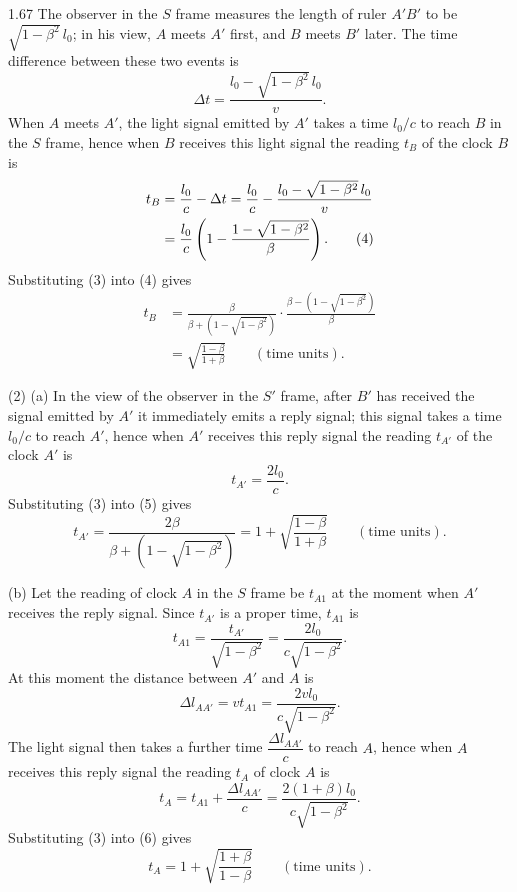 \begin{solution}{1.67}
The observer in the $S$ frame measures the length of ruler $A'B'$ to be $\sqrt{1-\beta^2}\,l_0$; in his view, $A$ meets $A'$ first, and $B$ meets $B'$ later. The time difference between these two events is
\[
\Delta t=\frac{l_0-\sqrt{1-\beta^2}\,l_0}{v}.
\]
When $A$ meets $A'$, the light signal emitted by $A'$ takes a time $l_0/c$ to reach $B$ in the $S$ frame, hence when $B$ receives this light signal the reading $t_B$ of the clock $B$ is
\begin{align}
t_B&=\frac{l_0}{c}-\Delta t=\frac{l_0}{c}-\frac{l_0-\sqrt{1-\beta^2}\,l_0}{v}\notag\\
&=\frac{l_0}{c}\left(1-\frac{1-\sqrt{1-\beta^2}}{\beta}\right). \tag{4}
\end{align}
Substituting (3) into (4) gives
\begin{align*}
t_B&=\frac{\beta}{\beta+\left(1-\sqrt{1-\beta^2}\right)}\cdot\frac{\beta-\left(1-\sqrt{1-\beta^2}\right)}{\beta}\\
&=\sqrt{\frac{1-\beta}{1+\beta}}\qquad(\text{time units}).
\end{align*}

(2) (a) In the view of the observer in the $S'$ frame, after $B'$ has received the signal emitted by $A'$ it immediately emits a reply signal; this signal takes a time $l_0/c$ to reach $A'$, hence when $A'$ receives this reply signal the reading $t_{A'}$ of the clock $A'$ is
\begin{equation}
t_{A'}=\frac{2l_0}{c}. \tag{5}
\end{equation}
Substituting (3) into (5) gives
\[
t_{A'}=\frac{2\beta}{\beta+\left(1-\sqrt{1-\beta^2}\right)}
=1+\sqrt{\frac{1-\beta}{1+\beta}}\qquad(\text{time units}).
\]

(b) Let the reading of clock $A$ in the $S$ frame be $t_{A1}$ at the moment when $A'$ receives the reply signal. Since $t_{A'}$ is a proper time, $t_{A1}$ is
\[
t_{A1}=\frac{t_{A'}}{\sqrt{1-\beta^2}}=\frac{2l_0}{c\sqrt{1-\beta^2}}.
\]
At this moment the distance between $A'$ and $A$ is
\[
\Delta l_{AA'}=vt_{A1}=\frac{2vl_0}{c\sqrt{1-\beta^2}}.
\]
The light signal then takes a further time $\dfrac{\Delta l_{AA'}}{c}$ to reach $A$, hence when $A$ receives this reply signal the reading $t_A$ of clock $A$ is
\begin{equation}
t_A=t_{A1}+\frac{\Delta l_{AA'}}{c}=\frac{2(1+\beta)l_0}{c\sqrt{1-\beta^2}}. \tag{6}
\end{equation}
Substituting (3) into (6) gives
\[
t_A=1+\sqrt{\frac{1+\beta}{1-\beta}}\qquad(\text{time units}).
\]
\end{solution}

